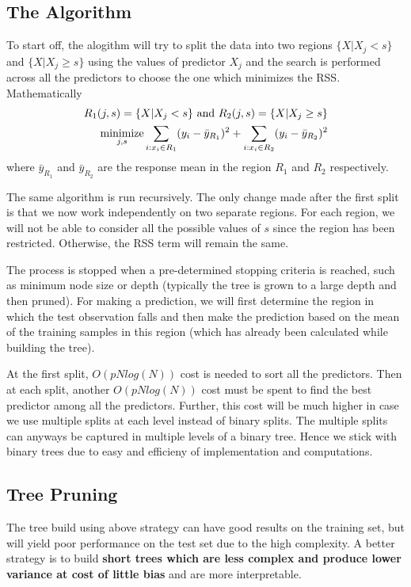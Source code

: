 \documentclass[../statistical_learning_notes.tex]{subfiles}
\begin{document}
    \subsection{The Algorithm}
    To start off, the alogithm will try to split the data into two regions $\{X|X_{j} < s\}$ and $\{X|X_{j} \geq s\}$ using the values of predictor $X_{j}$ and the search is performed across all the predictors to choose the one which minimizes the RSS. Mathematically
    \begin{align*}
        R_{1}(j,s) = \{X|X_{j} < s\} \text{ and } R_{2}(j,s) = \{X|X_{j} \geq s\}\\
        \operatorname*{minimize}_{j, s} \sum_{i:x_{i} \in R_{1}} (y_{i} - \bar{y}_{R_{1}})^{2} + \sum_{i:x_{i} \in R_{2}} (y_{i} - \bar{y}_{R_{2}})^{2}
    \end{align*}
    where $\bar{y}_{R_{1}}$ and $\bar{y}_{R_{2}}$ are the response mean in the region $R_{1}$ and $R_{2}$ respectively.\newline

    The same algorithm is run recursively. The only change made after the first split is that we now work independently on two separate regions. For each region, we will not be able to consider all the possible values of $s$ since the region has been restricted. Otherwise, the RSS term will remain the same.\newline

    The process is stopped when a pre-determined stopping criteria is reached, such as minimum node size or depth (typically the tree is grown to a large depth and then pruned). For making a prediction, we will first determine the region in which the test observation falls and then make the prediction based on the mean of the training samples in this region (which has already been calculated while building the tree).\newline

    At the first split, $O(pNlog(N))$ cost is needed to sort all the predictors. Then at each split, another $O(pNlog(N))$ cost must be spent to find the best predictor among all the predictors. Further, this cost will be much higher in case we use multiple splits at each level instead of binary splits. The multiple splits can anyways be captured in multiple levels of a binary tree. Hence we stick with binary trees due to easy and efficieny of implementation and computations. 


    \subsection{Tree Pruning}
    The tree build using above strategy can have good results on the training set, but will yield poor performance on the test set due to the high complexity. A better strategy is to build \textbf{short trees which are less complex and produce lower variance at cost of little bias} and are more interpretable.\newline
\end{document}
